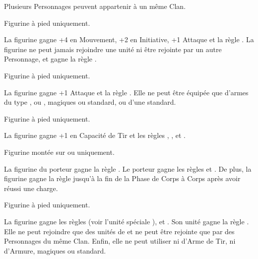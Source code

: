 \newpage
\begin{multicols}{2}\raggedcolumns
\startarmynewsection{\kindreds}

\spaceaftersection{}

Plusieurs Personnages peuvent appartenir à un même Clan.

\startpricelistNSP

Figurine à pied uniquement.

La figurine gagne +4 en Mouvement, +2 en Initiative, +1 Attaque et la règle . La figurine ne peut jamais rejoindre une unité ni être rejointe par un autre Personnage, et gagne la règle \notaleader{}.

Figurine à pied uniquement.

La figurine gagne +1 Attaque et la règle . Elle ne peut être équipée que d'armes du type \spear{}, \gw{} ou \sylvanblades{}, magiques ou standard, ou d'une \hw{} standard.

Figurine à pied uniquement.

La figurine gagne +1 en Capacité de Tir et les règles \scout{}, \masterarcher{}, et .

Figurine montée sur \elvenhorse{} ou \greatelk{} uniquement.

La figurine du porteur gagne la règle \frenzy{}. Le porteur gagne les règles \devastatingcharge{} et \lighttroops{}. De plus, la figurine gagne la règle \fear{} jusqu'à la fin de la Phase de Corps à Corps après avoir réussi une charge.

Figurine à pied uniquement.

La figurine gagne les règles \dancesofcenyrn{} (voir l'unité spéciale \bladedancers{}), \immunetopsychology{} et . Son unité gagne la règle \swiftstride{}. Elle ne peut rejoindre que des unités de \bladedancers{} et ne peut être rejointe que par des Personnages du même Clan. Enfin, elle ne peut utiliser ni d'Arme de Tir, ni d'Armure, magiques ou standard.

\endpricelistNSP
\closearmynewsection

\vspace*{\fill}
\columnbreak

\startarmynewsection{\aspectsofnature}

\spaceaftersection{}


\end{multicols}
